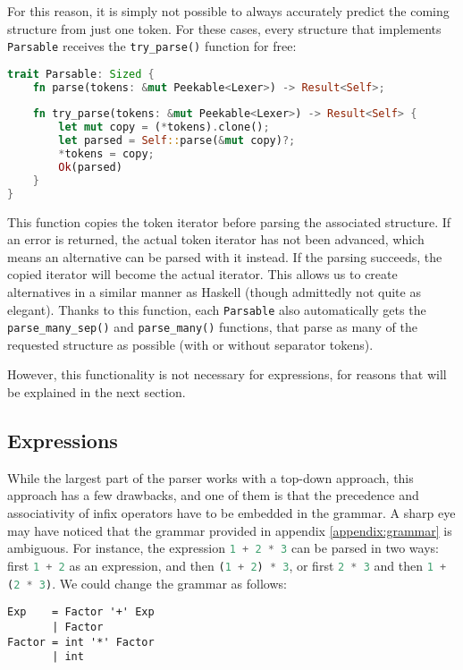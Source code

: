 For this reason, it is simply not possible to always accurately predict the coming structure from just one token. For these cases, every structure that implements \lstinline[language=rust]|Parsable| receives the \lstinline[language=rust]|try_parse()| function for free:

\begin{lstlisting}[language=rust]
trait Parsable: Sized {
    fn parse(tokens: &mut Peekable<Lexer>) -> Result<Self>;
    
    fn try_parse(tokens: &mut Peekable<Lexer>) -> Result<Self> {
        let mut copy = (*tokens).clone();
        let parsed = Self::parse(&mut copy)?;
        *tokens = copy;
        Ok(parsed)
    }
}
\end{lstlisting}

This function copies the token iterator before parsing the associated structure. If an error is returned, the actual token iterator has not been advanced, which means an alternative can be parsed with it instead. If the parsing succeeds, the copied iterator will become the actual iterator. This allows us to create alternatives in a similar manner as Haskell (though admittedly not quite as elegant). Thanks to this function, each \lstinline[language=rust]|Parsable| also automatically gets the \lstinline[language=rust]|parse_many_sep()| and \lstinline[language=rust]|parse_many()| functions, that parse as many of the requested structure as possible (with or without separator tokens).

However, this functionality is not necessary for expressions, for reasons that will be explained in the next section.

\subsection{Expressions}
While the largest part of the parser works with a top-down approach, this approach has a few drawbacks, and one of them is that the precedence and associativity of infix operators have to be embedded in the grammar. A sharp eye may have noticed that the grammar provided in appendix \ref{appendix:grammar} is ambiguous. For instance, the expression \lstinline[language=rust]|1 + 2 * 3| can be parsed in two ways: first \lstinline[language=rust]|1 + 2| as an expression, and then \lstinline[language=rust]|(1 + 2) * 3|, or first \lstinline[language=rust]|2 * 3| and then \lstinline[language=rust]|1 + (2 * 3)|. We could change the grammar as follows:

\begin{lstlisting}[language=spl]
Exp    = Factor '+' Exp
       | Factor
Factor = int '*' Factor
       | int
\end{lstlisting}

